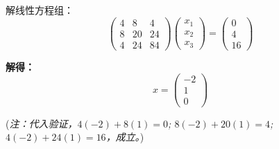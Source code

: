 \documentclass[12pt, a4paper]{article}
\begin{document}
\begin{enumerate}
		解线性方程组：
		\[
		\begin{pmatrix} 4 & 8 & 4 \\ 8 & 20 & 24 \\ 4 & 24 & 84 \end{pmatrix}
		\begin{pmatrix} x_1 \\ x_2 \\ x_3 \end{pmatrix}
		=
		\begin{pmatrix} 0 \\ 4 \\ 16 \end{pmatrix}
		\]
		
		\textbf{解得：}
		\[
		x = \begin{pmatrix} -2 \\ 1 \\ 0 \end{pmatrix}
		\]
		
		(\textit{注：代入验证，$4(-2)+8(1)=0$; $8(-2)+20(1)=4$; $4(-2)+24(1)=16$，成立。})
		
	\end{enumerate}
	
\end{document}
